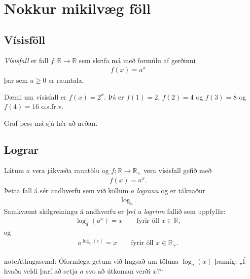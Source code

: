\documentclass[a4paper,10pt,icelandic]{sphinxmanual}
\begin{document}
\section{Nokkur mikilvæg föll}
\label{\detokenize{Kafli09:nokkur-mikilvaeg-foll}}

\subsection{Vísisföll}
\label{\detokenize{Kafli09:visisfoll}}
\textit{Vísisfall} er fall \(f : \mathbb{R} \to \mathbb{R}\) sem skrifa má með formúlu af gerðinni
\begin{equation*}
\begin{split}f(x)=a^x\end{split}
\end{equation*}
þar sem \(a \geq 0\) er rauntala.

Dæmi um vísisfall er \(f(x)=2^x\). Þá er \(f(1)=2\), \(f(2)=4\) og \(f(3)=8\) og \(f(4)=16\) o.s.fr.v.

Graf þess má sjá hér að neðan.



\subsection{Lograr}
\label{\detokenize{Kafli09:lograr}}
Látum \(a\) vera jákvæða rauntölu og \(f: \mathbb{R} \to \mathbb{R}_+\) vera vísisfall gefið með
\begin{equation*}
\begin{split}f(x)=a^x.\end{split}
\end{equation*}
Þetta fall á sér andhverfu sem við köllum \(a\)\sphinxhyphen{} \textit{logrann} og er táknaður
\begin{equation*}
\begin{split}\log_a.\end{split}
\end{equation*}
Samkvæmt skilgreiningu á andhverfu er því \(a\)\sphinxhyphen{} \textit{logrinn}  fallið sem uppfyllir:
\begin{equation*}
\begin{split}\log_a(a^x)=x \qquad \text{fyrir öll } x \in \mathbb{R},\end{split}
\end{equation*}
og
\begin{equation*}
\begin{split}a^{\log_a(x)}=x \qquad \text{fyrir öll } x \in \mathbb{R}_+.\end{split}
\end{equation*}
\begin{sphinxadmonition}{note}{Athugasemd:}
Óformlega getum við hugsað um töluna \(\log_a(x)\) þannig: „Í hvaða veldi þarf að setja \(a\) svo að útkoman verði \(x\)?“
\end{sphinxadmonition}
\end{document}
